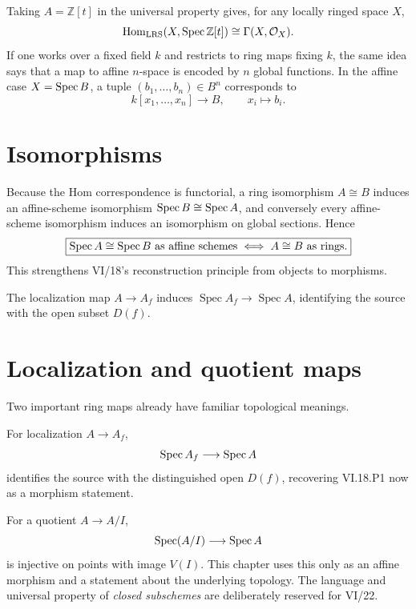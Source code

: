 Taking $A=\mathbb Z[t]$ in the universal property gives, for any locally ringed space $X$,
\[
\operatorname{Hom}_{\mathrm{LRS}}(X,\operatorname{Spec}\mathbb Z[t])
\cong\Gamma(X,\mathcal O_X).
\]
If one works over a fixed field $k$ and restricts to ring maps fixing $k$, the same idea says
that a map to affine $n$-space is encoded by $n$ global functions.  In the affine case
$X=\operatorname{Spec} B$, a tuple $(b_1,\dots,b_n)\in B^n$ corresponds to
\[
k[x_1,\dots,x_n]\longrightarrow B,
\qquad
x_i\longmapsto b_i.
\]



\section{Isomorphisms}

Because the Hom correspondence is functorial, a ring isomorphism $A\cong B$ induces an
affine-scheme isomorphism $\operatorname{Spec} B\cong\operatorname{Spec} A$, and conversely every affine-scheme
isomorphism induces an isomorphism on global sections.  Hence
\[
\boxed{
\operatorname{Spec} A\cong\operatorname{Spec} B\text{ as affine schemes}
\iff
A\cong B\text{ as rings}.
}
\]
This strengthens VI/18's reconstruction principle from objects to morphisms.

\begin{example}\label{ex:vi19-expand-03}
The localization map $A\to A_f$ induces $\operatorname{Spec}A_f\to\operatorname{Spec}A$, identifying the source with the open subset $D(f)$.
\end{example}
\section{Localization and quotient maps}

Two important ring maps already have familiar topological meanings.

For localization $A\to A_f$,
\[
\operatorname{Spec} A_f\longrightarrow\operatorname{Spec} A
\]
identifies the source with the distinguished open $D(f)$, recovering VI.18.P1 now as a
morphism statement.

For a quotient $A\to A/I$,
\[
\operatorname{Spec}(A/I)\longrightarrow\operatorname{Spec} A
\]
is injective on points with image $V(I)$.  This chapter uses this only as an affine morphism
and a statement about the underlying topology.  The language and universal property of
\emph{closed subschemes} are deliberately reserved for VI/22.

